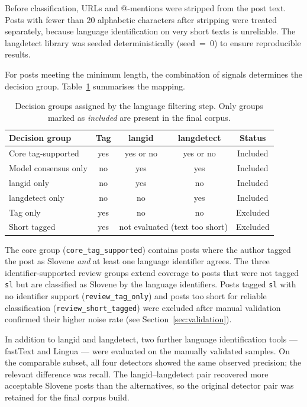 Before classification, URLs and @-mentions were stripped from the post text. Posts with fewer than 20 alphabetic characters after stripping were treated separately, because language identification on very short texts is unreliable. The langdetect library was seeded deterministically (seed~=~0) to ensure reproducible results.

For posts meeting the minimum length, the combination of signals determines the decision group. Table~\ref{tab:decision-groups} summarises the mapping.

\begin{table}[htbp]
\centering
\caption{Decision groups assigned by the language filtering step. Only groups marked as \textit{included} are present in the final corpus.}
\label{tab:decision-groups}
\begin{tabularx}{\linewidth}{Xcccc}
\toprule
Decision group & Tag & langid & langdetect & Status \\
\midrule
Core tag-supported        & yes & yes or no & yes or no & Included \\
Model consensus only & no & yes & yes & Included \\
langid only         & no & yes & no         & Included \\
langdetect only     & no & no         & yes & Included \\
\midrule
Tag only            & yes & no         & no         & Excluded \\
Short tagged        & yes & \multicolumn{2}{c}{not evaluated (text too short)} & Excluded \\
\bottomrule
\end{tabularx}
\end{table}

The core group (\texttt{core\_tag\_supported}) contains posts where the author tagged the post as Slovene \textit{and} at least one language identifier agrees. The three identifier-supported review groups extend coverage to posts that were not tagged \texttt{sl} but are classified as Slovene by the language identifiers. Posts tagged \texttt{sl} with no identifier support (\texttt{review\_tag\_only}) and posts too short for reliable classification (\texttt{review\_short\_tagged}) were excluded after manual validation confirmed their higher noise rate (see Section~\ref{sec:validation}).

In addition to langid and langdetect, two further language identification tools --- fastText \parencite{joulin2017bag} and Lingua --- were evaluated on the manually validated samples. On the comparable subset, all four detectors showed the same observed precision; the relevant difference was recall. The langid--langdetect pair recovered more acceptable Slovene posts than the alternatives, so the original detector pair was retained for the final corpus build.

